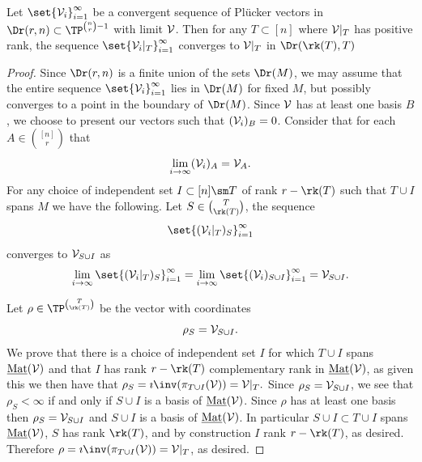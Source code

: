 \begin{proposition}\label{prop:plConvergence}
Let $\set{\sV_i}_{i=1}^\infty$ be a convergent sequence of Pl\"ucker vectors in $\Dr(r,n)\subset \TP^{\binom{n}{r}-1}$ with limit $\mathcal{V}$. Then for any $T\subset [n]$ where $\mathcal{V}|_T$ has positive rank, the sequence $\set{\sV_i|_T}_{i=1}^\infty$ converges to $\mathcal{V}|_T$ in $\Dr(\rk(T), T)$
\end{proposition}
\begin{proof}
 Since $\Dr(r,n)$ is a finite union of the sets $\Dr(M)$, we may assume that the entire sequence $\set{\sV_i}_{i=1}^\infty$ lies in $\Dr(M)$ for fixed $M$, but possibly converges to a point in the boundary of $\Dr(M)$.  Since $\mathcal{V}$ has at least one basis $B$, we choose to present our vectors such that $(\mathcal{V}_i)_B = 0$. 
 Consider that for each $A\in \binom{[n]}{r}$ that 
 $$\lim_{i\to \infty} (\mathcal{V}_i)_A = \mathcal{V}_A.$$
 For any choice of independent set $I\subset [n]\sm T$ of rank $r-\rk(T)$ such that $T\cup I$ spans $M$ we have the following. Let $S\in \binom{T}{\rk(T)}$, the sequence
 $$\set{(\sV_i|_{T})_S}_{i=1}^\infty$$ 
 converges to $\mathcal{V}_{S\cup I}$ as
 $$\lim_{i\to\infty}\set{(\sV_i|_{T})_S}_{i=1}^\infty=\lim_{i\to\infty}\set{(\sV_i)_{S\cup I}}_{i=1}^\infty=\sV_{S\cup I}.$$
 
Let $\rho\in \TP^{\binom{T}{\rk(T)}}$ be the vector with coordinates 
$$\rho_S = \mathcal{V}_{S\cup I}.$$
We prove that there is a choice of independent set $I$ for which $T\cup I$ spans $\operatorname{\underline{Mat}}(\mathcal{V})$ and that $I$ has rank $r-\rk(T)$ complementary rank in $\operatorname{\underline{Mat}}(\mathcal{V})$, as given this we then have that $\rho_S = \imath\inv(\pi_{T\cup I}(\sV))= \sV|_T.$ Since $\rho_S = \mathcal{V}_{S\cup I}$, we see that $\rho_S<\infty$ if and only if $S\cup I$ is a basis of $\operatorname{\underline{Mat}}(\mathcal{V})$. Since $\rho$ has at least one basis then $\rho_S = \mathcal{V}_{S\cup I}$ and $S\cup I$ is a basis of $\operatorname{\underline{Mat}}(\mathcal{V})$. In particular $S\cup I\subset T\cup I$ spans $\operatorname{\underline{Mat}}(\mathcal{V})$, $S$ has rank $\rk(T)$, and by construction $I$ rank $r-\rk(T)$, as desired. Therefore $\rho = \imath\inv(\pi_{T\cup I}(\sV)) = \sV|_T$, as desired.
\end{proof}



